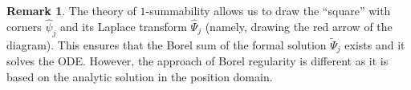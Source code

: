 \documentclass{article}
\theoremstyle{definition}
\newcommand{\series}[1]{\tilde{#1}}
\newcommand{\laplace}{\mathcal{L}}
\newcommand{\borel}{\mathcal{B}}
\newtheorem{remark}[definition]{Remark}
\theoremstyle{plain}
\begin{document}
\begin{remark}
The theory of $1$-summability allows us to draw the ``square'' with corners $\hat{\psi}_j$ and its Laplace transform $\hat{\Psi}_j$ (namely, drawing the red arrow of the diagram). This ensures that the Borel sum of the formal solution $\series{\Psi}_j$ exists and it solves the ODE. However, the approach of Borel regularity is different as it is based on the analytic solution in the position domain. 
\end{remark}


\end{document}
